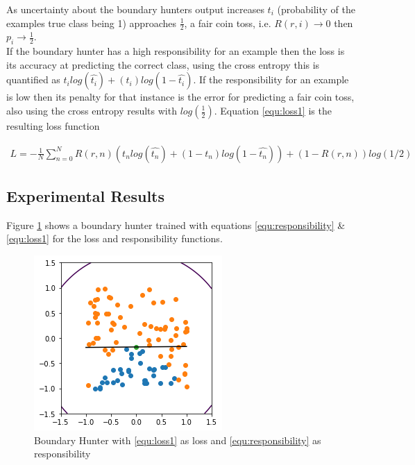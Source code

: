 \documentclass[notitlepage]{report}
\theoremstyle{definition}
\begin{document}
As uncertainty about the boundary hunters output increases $t_i$ (probability of the examples true class being 1) approaches $\frac{1}{2}$, a fair coin toss, i.e. $R(r, i) \rightarrow 0$ then $p_i \rightarrow \frac{1}{2}$.\\

If the boundary hunter has a high responsibility for an example then the loss is its accuracy at predicting the correct class, using the cross entropy this is quantified as $t_i log(\widehat{t_i}) + (t_i)log(1 - \widehat{t_i})$. If the responsibility for an example is low then its penalty for that instance is the error for predicting a fair coin toss, also using the cross entropy results with $log(\frac{1}{2})$. Equation \ref{equ:loss1} is the resulting loss function

\begin{align}
L = -\frac{1}{N} \sum_{n=0}^N R(r, n) (t_n log(\widehat{t_n}) + (1-t_n)log(1 - \widehat{t_n})) + (1-R(r, n)) log(1/2)
\label{equ:loss1}
\end{align}

\subsection{Experimental Results}
Figure \ref{fig:boundaryhunter-l1-01} shows a boundary hunter trained with equations \ref{equ:responsibility} \& \ref{equ:loss1} for the loss and responsibility functions.

\begin{figure}[H]
\centering
  \begin{minipage}[b]{0.4\textwidth}
    \includegraphics[width=\textwidth]{BoundaryHunter-Attempt1-01.png}
    \caption{Boundary Hunter with \ref{equ:loss1} as loss and \ref{equ:responsibility} as responsibility}
    \label{fig:boundaryhunter-l1-01}
  \end{minipage}
  \hfill
\end{figure}
\end{document}
